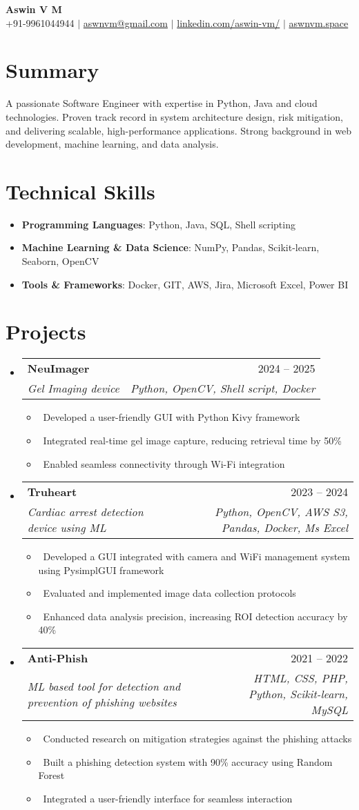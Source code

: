 \documentclass[letterpaper,10pt]{article}
\makeatletter
\newcommand{\resumeItem}[1]{\item\small{#1}}
\newcommand{\resumeSubheading}[4]{
\vspace{-1pt}\item
  \begin{tabular*}{0.97\textwidth}[t]{l@{\extracolsep{\fill}}r}
    \textbf{#1} & #2 \\
    \textit{#3} & \textit{#4} \\
  \end{tabular*}\vspace{-7pt}
}
\newcommand{\resumeSubHeadingList}{\begin{itemize}[leftmargin=0.15in, label={}]}
\newcommand{\resumeSubHeadingListEnd}{\end{itemize}}
\makeatother
\begin{document}
\begin{center}
  \textbf{\Huge Aswin V M} \\
  \small +91-9961044944 $|$ \href{mailto:aswnvm@gmail.com}{aswnvm@gmail.com} $|$
  \href{https://linkedin.com/in/aswin-vm}{linkedin.com/aswin-vm/} $|$
  \href{https://aswnvm.space}{aswnvm.space}
\end{center}

\section*{Summary}
A passionate Software Engineer with expertise in Python, Java and cloud technologies. Proven track record in system architecture design, risk mitigation, and delivering scalable, high-performance applications. Strong background in web development, machine learning, and data analysis.

\section{Technical Skills}
\resumeSubHeadingList
\resumeItem{\textbf{Programming Languages}: Python, Java, SQL, Shell scripting}
\resumeItem{\textbf{Machine Learning \& Data Science}: NumPy, Pandas, Scikit-learn, Seaborn, OpenCV}

\resumeItem{\textbf{Tools \& Frameworks}: Docker, GIT, AWS, Jira, Microsoft Excel, Power BI}
\resumeSubHeadingListEnd

\section{Projects}
\resumeSubHeadingList
\resumeSubheading
{NeuImager }{2024 -- 2025}
{Gel Imaging device}{Python, OpenCV, Shell script, Docker}
\resumeSubHeadingList
\resumeItem{\textbullet\	Developed a user-friendly GUI with Python Kivy framework}
\resumeItem{\textbullet\ 	Integrated real-time gel image capture, reducing retrieval time by 50\%}
\resumeItem{\textbullet\ 	Enabled seamless connectivity through Wi-Fi integration}
\resumeSubHeadingListEnd
\resumeSubheading
{Truheart}{2023 --  2024}
{Cardiac arrest detection device using ML}{Python, OpenCV, AWS S3, Pandas, Docker, Ms Excel}
\resumeSubHeadingList
\resumeItem{\textbullet\	Developed a GUI integrated with camera and WiFi management system using PysimplGUI framework }
\resumeItem{\textbullet\	Evaluated and implemented image data collection protocols}
\resumeItem{\textbullet\	Enhanced data analysis precision, increasing ROI detection accuracy by 40\%}
\resumeSubHeadingListEnd
\resumeSubheading
{Anti-Phish}{2021 --  2022}
{ML based tool for detection and prevention of phishing websites}{HTML, CSS, PHP, Python, Scikit-learn, MySQL}
\resumeSubHeadingList
\resumeItem{\textbullet\	Conducted research on mitigation strategies against the phishing attacks }
\resumeItem{\textbullet\	Built a phishing detection system with 90\% accuracy using Random Forest}
\resumeItem{\textbullet\	Integrated a user-friendly interface for seamless interaction}
\resumeSubHeadingListEnd
\resumeSubHeadingListEnd
\end{document}
